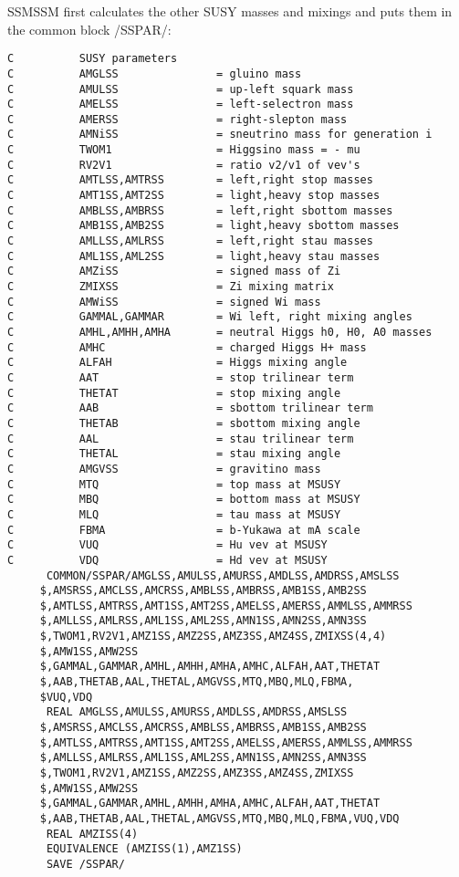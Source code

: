       SSMSSM first calculates the other SUSY masses and mixings and puts
them in the common block /SSPAR/:
\begin{verbatim}
C          SUSY parameters
C          AMGLSS               = gluino mass
C          AMULSS               = up-left squark mass
C          AMELSS               = left-selectron mass
C          AMERSS               = right-slepton mass
C          AMNiSS               = sneutrino mass for generation i
C          TWOM1                = Higgsino mass = - mu
C          RV2V1                = ratio v2/v1 of vev's
C          AMTLSS,AMTRSS        = left,right stop masses
C          AMT1SS,AMT2SS        = light,heavy stop masses
C          AMBLSS,AMBRSS        = left,right sbottom masses
C          AMB1SS,AMB2SS        = light,heavy sbottom masses
C          AMLLSS,AMLRSS        = left,right stau masses
C          AML1SS,AML2SS        = light,heavy stau masses
C          AMZiSS               = signed mass of Zi
C          ZMIXSS               = Zi mixing matrix
C          AMWiSS               = signed Wi mass
C          GAMMAL,GAMMAR        = Wi left, right mixing angles
C          AMHL,AMHH,AMHA       = neutral Higgs h0, H0, A0 masses
C          AMHC                 = charged Higgs H+ mass
C          ALFAH                = Higgs mixing angle
C          AAT                  = stop trilinear term
C          THETAT               = stop mixing angle
C          AAB                  = sbottom trilinear term
C          THETAB               = sbottom mixing angle
C          AAL                  = stau trilinear term
C          THETAL               = stau mixing angle
C          AMGVSS               = gravitino mass
C          MTQ                  = top mass at MSUSY
C          MBQ                  = bottom mass at MSUSY
C          MLQ                  = tau mass at MSUSY
C          FBMA                 = b-Yukawa at mA scale
C          VUQ                  = Hu vev at MSUSY
C          VDQ                  = Hd vev at MSUSY
      COMMON/SSPAR/AMGLSS,AMULSS,AMURSS,AMDLSS,AMDRSS,AMSLSS
     $,AMSRSS,AMCLSS,AMCRSS,AMBLSS,AMBRSS,AMB1SS,AMB2SS
     $,AMTLSS,AMTRSS,AMT1SS,AMT2SS,AMELSS,AMERSS,AMMLSS,AMMRSS
     $,AMLLSS,AMLRSS,AML1SS,AML2SS,AMN1SS,AMN2SS,AMN3SS
     $,TWOM1,RV2V1,AMZ1SS,AMZ2SS,AMZ3SS,AMZ4SS,ZMIXSS(4,4)
     $,AMW1SS,AMW2SS
     $,GAMMAL,GAMMAR,AMHL,AMHH,AMHA,AMHC,ALFAH,AAT,THETAT
     $,AAB,THETAB,AAL,THETAL,AMGVSS,MTQ,MBQ,MLQ,FBMA,
     $VUQ,VDQ
      REAL AMGLSS,AMULSS,AMURSS,AMDLSS,AMDRSS,AMSLSS
     $,AMSRSS,AMCLSS,AMCRSS,AMBLSS,AMBRSS,AMB1SS,AMB2SS
     $,AMTLSS,AMTRSS,AMT1SS,AMT2SS,AMELSS,AMERSS,AMMLSS,AMMRSS
     $,AMLLSS,AMLRSS,AML1SS,AML2SS,AMN1SS,AMN2SS,AMN3SS
     $,TWOM1,RV2V1,AMZ1SS,AMZ2SS,AMZ3SS,AMZ4SS,ZMIXSS
     $,AMW1SS,AMW2SS
     $,GAMMAL,GAMMAR,AMHL,AMHH,AMHA,AMHC,ALFAH,AAT,THETAT
     $,AAB,THETAB,AAL,THETAL,AMGVSS,MTQ,MBQ,MLQ,FBMA,VUQ,VDQ
      REAL AMZISS(4)
      EQUIVALENCE (AMZISS(1),AMZ1SS)
      SAVE /SSPAR/
\end{verbatim}

